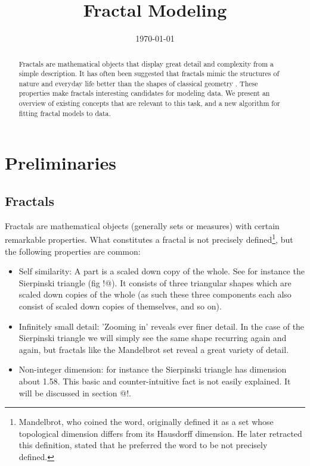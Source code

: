 \documentclass[11pt, twocolumn]{article}
\title{Fractal Modeling}
\date{\today}
\theoremstyle{definition}
\begin{document}
\maketitle

\begin{abstract}
\noindent Fractals are mathematical objects that display great detail and complexity from a simple description. It has often been suggested that fractals mimic the structures of nature and everyday life better than the shapes of classical geometry \cite{}. These properties make fractals interesting candidates for modeling data. We present an overview of existing concepts that are relevant to this task, and a new algorithm for fitting fractal models to data. 
\end{abstract}


\section{Preliminaries}
\subsection{Fractals}

Fractals are mathematical objects (generally sets or measures) with certain remarkable properties. What constitutes a fractal is not precisely defined\footnote{Mandelbrot, who coined the word, originally defined it as a set whose topological dimension differs from its Hausdorff dimension. He later retracted this definition, stated that he preferred the word to be not precisely defined.}, but the following properties are common:


\begin{itemize}
  \item Self similarity: A part is a scaled down copy of the whole. See for instance the Sierpinski triangle (fig !@). It consists of three triangular shapes which are scaled down copies of the whole (as such these three components each also consist of scaled down copies of themselves, and so on).
  \item Infinitely small detail: 'Zooming in' reveals ever finer detail. In the case of the Sierpinski triangle we will simply see the same shape recurring again and again, but fractals like the Mandelbrot set reveal a great variety of detail.
  \item Non-integer dimension: for instance the Sierpinski triangle has dimension about 1.58. This basic and counter-intuitive fact is not easily explained. It will be discussed in section @!.
\end{itemize}
\end{document}
